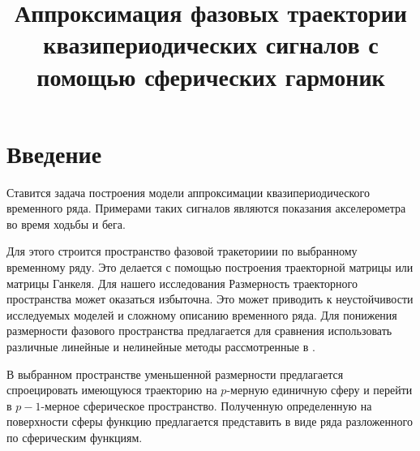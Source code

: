 \documentclass[12pt,twoside]{article}
\title
    [Аппроксимация фазовой траектории] 
    {Аппроксимация фазовых траектории квазипериодических сигналов с помощью сферических гармоник}
\begin{document}
\newcommand{\nsymbol}[2]{\medskip\hangindent=\parindent\hangafter=1\noindent $#1$ --- #2\par}
\newcommand{\nsymbolp}[3]{\nsymbol{#1}{#2 \dotfill\pageref{#3}}}

\newcommand{\hookuparrow}{\mathrel{\rotatebox[origin=t]{270}{$\hookleftarrow$}}}
\newcommand{\hookdownarrow}{\mathrel{\rotatebox[origin=t]{90}{$\hookleftarrow$}}}

\maketitle

\section{Введение}
Ставится задача построения модели аппроксимации квазипериодического временного ряда. Примерами таких сигналов являются показания акселерометра во время ходьбы и бега.\cite{1999}  
	
Для этого строится пространство фазовой тракеториии по выбранному временному ряду.  Это делается с помощью построения траекторной матрицы или матрицы Ганкеля.
Для нашего исследования 
Размерность траекторного пространства может оказаться избыточна. Это может приводить к неустойчивости исследуемых моделей и сложному описанию временного ряда. Для понижения размерности фазового пространства предлагается для сравнения использовать  различные линейные и нелинейные методы рассмотренные в \cite{Maaten2007}.
	
В выбранном пространстве уменьшенной размерности предлагается спроецировать имеющуюся траекторию на $p$-мерную единичную сферу и перейти в $p-1$-мерное сферическое пространство. Полученную определенную на поверхности сферы функцию предлагается представить в виде ряда разложенного по сферическим функциям.
\end{document}
